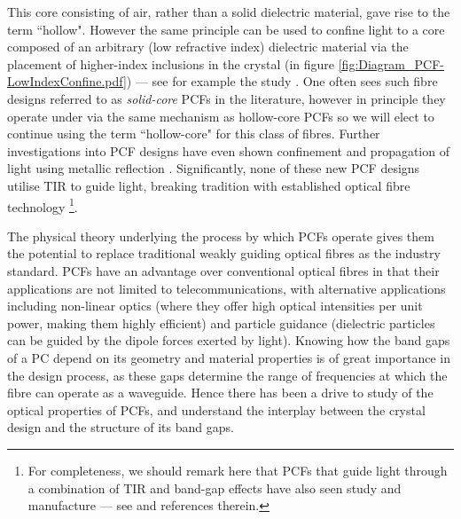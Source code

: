 This core consisting of air, rather than a solid dielectric material, gave rise to the term ``hollow".
However the same principle can be used to confine light to a core composed of an arbitrary (low refractive index) dielectric material via the placement of higher-index inclusions in the crystal (in figure \ref{fig:Diagram_PCF-LowIndexConfine.pdf}) --- see for example the study \cite{luan2004allsolid}.
One often sees such fibre designs referred to as \emph{solid-core} PCFs in the literature, however in principle they operate under via the same mechanism as hollow-core PCFs so we will elect to continue using the term ``hollow-core" for this class of fibres.
Further investigations into PCF designs have even shown confinement and propagation of light using metallic reflection \cite{hou2008metallic}.
Significantly, none of these new PCF designs utilise TIR to guide light, breaking tradition with established optical fibre technology \cite{knight2003photonic, russell2003photonic}\footnote{For completeness, we should remark here that PCFs that guide light through a combination of TIR and band-gap effects have also seen study and manufacture --- see \cite{xu2018hybrid} and references therein.}.

The physical theory underlying the process by which PCFs operate gives them the potential to replace traditional weakly guiding optical fibres as the industry standard.
PCFs have an advantage over conventional optical fibres in that their applications are not limited to telecommunications, with alternative applications including non-linear optics (where they offer high optical intensities per unit power, making them highly efficient) and particle guidance (dielectric particles can be guided by the dipole forces exerted by light).
Knowing how the band gaps of a PC depend on its geometry and material properties is of great importance in the design process, as these gaps determine the range of frequencies at which the fibre can operate as a waveguide.
Hence there has been a drive to study of the optical properties of PCFs, and understand the interplay between the crystal design and the structure of its band gaps.

